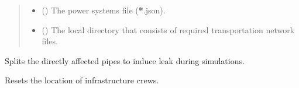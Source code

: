 \documentclass[letterpaper,10pt,english]{sphinxmanual}
\begin{document}
\begin{fulllineitems}
\begin{fulllineitems}
\begin{quote}
\begin{description}
\begin{itemize}
\item {} 
\sphinxAtStartPar
{} () \textendash{} The power systems file ({\color{red}\bfseries{}*}.json).

\item {} 
\sphinxAtStartPar
{} () \textendash{} The local directory that consists of required transportation network files.

\end{itemize}

\end{description}\end{quote}

\end{fulllineitems}


\begin{fulllineitems}
\label{\detokenize{apidoc:dreaminsg_integrated_model.src.network_sim_models.integrated_network.IntegratedNetwork.pipe_leak_node_generator}}
\sphinxAtStartPar
Splits the directly affected pipes to induce leak during simulations.

\end{fulllineitems}


\begin{fulllineitems}
\label{\detokenize{apidoc:dreaminsg_integrated_model.src.network_sim_models.integrated_network.IntegratedNetwork.reset_crew_locs}}
\sphinxAtStartPar
Resets the location of infrastructure crews.

\end{fulllineitems}



\end{fulllineitems}
\end{document}
